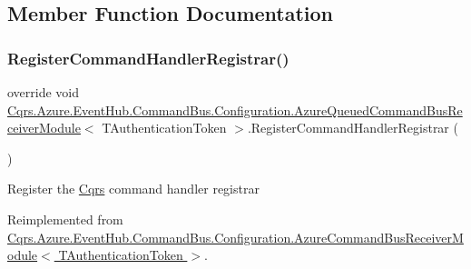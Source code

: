 \subsection{Member Function Documentation}
\mbox{\label{classCqrs_1_1Azure_1_1EventHub_1_1CommandBus_1_1Configuration_1_1AzureQueuedCommandBusReceiverModule_a30d8ea5555bbb38bfddc6b5aa1e3dd1c}} 
\subsubsection{\texorpdfstring{Register\+Command\+Handler\+Registrar()}{RegisterCommandHandlerRegistrar()}}
{\footnotesize\ttfamily override void \hyperlink{classCqrs_1_1Azure_1_1EventHub_1_1CommandBus_1_1Configuration_1_1AzureQueuedCommandBusReceiverModule}{Cqrs.\+Azure.\+Event\+Hub.\+Command\+Bus.\+Configuration.\+Azure\+Queued\+Command\+Bus\+Receiver\+Module}$<$ T\+Authentication\+Token $>$.Register\+Command\+Handler\+Registrar (\begin{DoxyParamCaption}{ }\end{DoxyParamCaption})\hspace{0.3cm}{\ttfamily [virtual]}}



Register the \hyperlink{namespaceCqrs}{Cqrs} command handler registrar 



Reimplemented from \hyperlink{classCqrs_1_1Azure_1_1EventHub_1_1CommandBus_1_1Configuration_1_1AzureCommandBusReceiverModule_a62975fe00dd6c7f62b5eba6bb6eed7c4}{Cqrs.\+Azure.\+Event\+Hub.\+Command\+Bus.\+Configuration.\+Azure\+Command\+Bus\+Receiver\+Module$<$ T\+Authentication\+Token $>$}.

